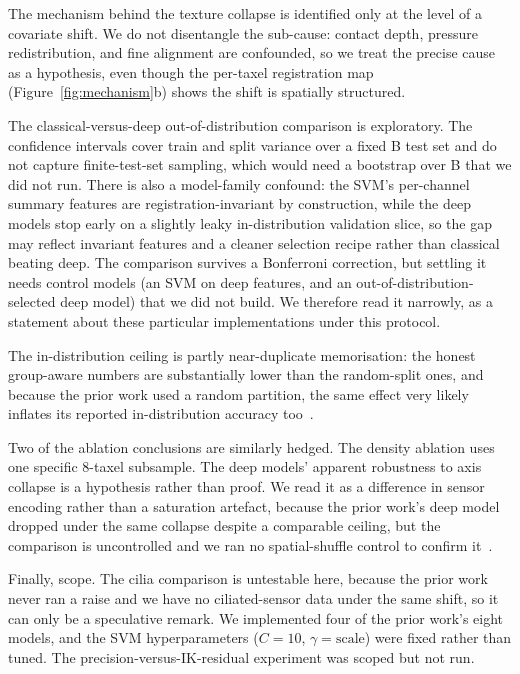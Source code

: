 \documentclass[journal]{IEEEtran}
\begin{document}
The mechanism behind the texture collapse is identified only at the level of a
covariate shift. We do not disentangle the sub-cause: contact depth, pressure
redistribution, and fine alignment are confounded, so we treat the precise cause as
a hypothesis, even though the per-taxel registration map (Figure~\ref{fig:mechanism}b)
shows the shift is spatially structured.

The classical-versus-deep out-of-distribution comparison is exploratory. The
confidence intervals cover train and split variance over a fixed B test set and do
not capture finite-test-set sampling, which would need a bootstrap over B that we
did not run. There is also a model-family confound: the SVM's per-channel summary
features are registration-invariant by construction, while the deep models stop
early on a slightly leaky in-distribution validation slice, so the gap may reflect
invariant features and a cleaner selection recipe rather than classical beating
deep. The comparison survives a Bonferroni correction, but settling it needs control
models (an SVM on deep features, and an out-of-distribution-selected deep model)
that we did not build. We therefore read it narrowly, as a statement about these
particular implementations under this protocol.

The in-distribution ceiling is partly near-duplicate memorisation: the honest
group-aware numbers are substantially lower than the random-split ones, and because
the prior work used a random partition, the same effect very likely inflates its
reported in-distribution accuracy too~\cite{cmd_source}.

Two of the ablation conclusions are similarly hedged. The density ablation uses one
specific 8-taxel subsample. The deep models' apparent robustness to axis collapse is
a hypothesis rather than proof. We read it as a difference in sensor encoding rather
than a saturation artefact, because the prior work's deep model dropped under the
same collapse despite a comparable ceiling, but the comparison is uncontrolled and
we ran no spatial-shuffle control to confirm it~\cite{cmd_source}.

Finally, scope. The cilia comparison is untestable here, because the prior work
never ran a raise and we have no ciliated-sensor data under the same shift, so it can
only be a speculative remark. We implemented four of the prior work's eight models,
and the SVM hyperparameters ($C=10$, $\gamma=\mathrm{scale}$) were fixed rather than
tuned. The precision-versus-IK-residual experiment was scoped but not run.
\end{document}
